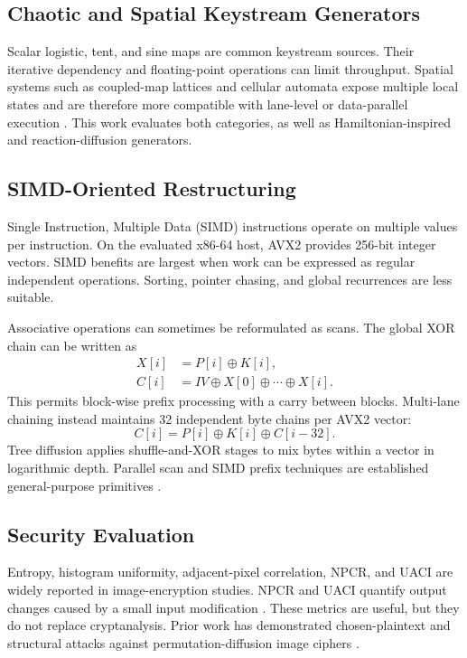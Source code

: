 \documentclass[twocolumn,runningheads]{svjour3}
\begin{document}
\subsection{Chaotic and Spatial Keystream Generators}
Scalar logistic, tent, and sine maps are common keystream sources. Their
iterative dependency and floating-point operations can limit throughput.
Spatial systems such as coupled-map lattices and cellular automata expose
multiple local states and are therefore more compatible with lane-level or
data-parallel execution \cite{chai2015}. This work evaluates both categories,
as well as Hamiltonian-inspired and reaction-diffusion generators.

\subsection{SIMD-Oriented Restructuring}
Single Instruction, Multiple Data (SIMD) instructions operate on multiple
values per instruction. On the evaluated x86-64 host, AVX2 provides 256-bit
integer vectors. SIMD benefits are largest when work can be expressed as
regular independent operations. Sorting, pointer chasing, and global
recurrences are less suitable.

Associative operations can sometimes be reformulated as scans. The global XOR
chain can be written as
\begin{align}
X[i] &= P[i] \oplus K[i], \\
C[i] &= IV \oplus X[0] \oplus \cdots \oplus X[i].
\label{eq:prefix-chain}
\end{align}
This permits block-wise prefix processing with a carry between blocks.
Multi-lane chaining instead maintains 32 independent byte chains per AVX2
vector:
\begin{equation}
C[i] = P[i] \oplus K[i] \oplus C[i-32].
\label{eq:multilane}
\end{equation}
Tree diffusion applies shuffle-and-XOR stages to mix bytes within a vector in
logarithmic depth. Parallel scan and SIMD prefix techniques are established
general-purpose primitives \cite{zhang2023}.

\subsection{Security Evaluation}
Entropy, histogram uniformity, adjacent-pixel correlation, NPCR, and UACI are
widely reported in image-encryption studies. NPCR and UACI quantify output
changes caused by a small input modification \cite{wu2011}. These metrics are
useful, but they do not replace cryptanalysis. Prior work has demonstrated
chosen-plaintext and structural attacks against permutation-diffusion image
ciphers \cite{li2018,liu2015}.
\end{document}
